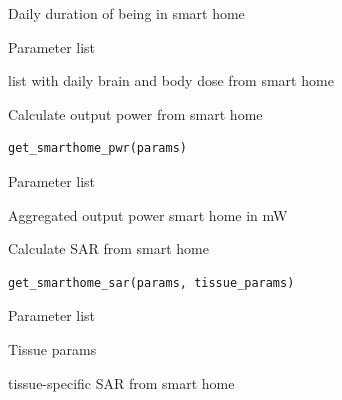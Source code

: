\documentclass[a4paper]{book}
\begin{document}
%
\begin{Arguments}
\begin{ldescription}
\item[\code{duration\_smarthome}] Daily duration of being in smart home

\item[\code{params}] Parameter list
\end{ldescription}
\end{Arguments}
%
\begin{Value}
list with daily brain and body dose from smart home
\end{Value}
%
\begin{Description}
Calculate output power from smart home
\end{Description}
%
\begin{Usage}
\begin{verbatim}
get_smarthome_pwr(params)
\end{verbatim}
\end{Usage}
%
\begin{Arguments}
\begin{ldescription}
\item[\code{params}] Parameter list
\end{ldescription}
\end{Arguments}
%
\begin{Value}
Aggregated output power smart home in mW
\end{Value}
%
\begin{Description}
Calculate SAR from smart home
\end{Description}
%
\begin{Usage}
\begin{verbatim}
get_smarthome_sar(params, tissue_params)
\end{verbatim}
\end{Usage}
%
\begin{Arguments}
\begin{ldescription}
\item[\code{params}] Parameter list

\item[\code{tissue\_params}] Tissue params
\end{ldescription}
\end{Arguments}
%
\begin{Value}
tissue-specific SAR from smart home
\end{Value}
\end{document}
